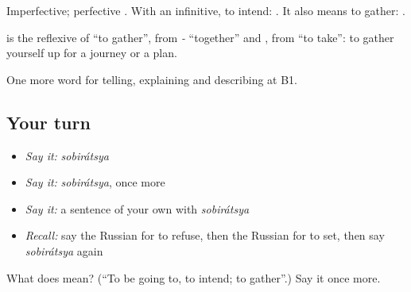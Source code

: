 Imperfective; perfective \emph{}. With an infinitive, to intend: \emph{  }. It also means to gather: \emph{ }.

\begin{cousinweb}
\textbf{} is the reflexive of \emph{} \textquotedblleft{}to gather\textquotedblright{}, from \emph{-} \textquotedblleft{}together\textquotedblright{} and \emph{}, from \emph{} \textquotedblleft{}to take\textquotedblright{}: to gather yourself up for a journey or a plan.
\end{cousinweb}

\begin{grammarlens}[title={What you've built}]
One more word for telling, explaining and describing at B1.
\end{grammarlens}

\subsection*{Your turn}
\begin{itemize}
\raggedright
  \item \emph{Say it:} \emph{sobirátsya}
  \item \emph{Say it:} \emph{sobirátsya}, once more
  \item \emph{Say it:} a sentence of your own with \emph{sobirátsya}
  \item \emph{Recall:} say the Russian for to refuse, then the Russian for to set, then say \emph{sobirátsya} again
\end{itemize}

\begin{tcolorbox}[breakable,colback=teal!4,colframe=teal!35!black,title={Before you move on}]
What does  mean? (\textquotedblleft{}To be going to, to intend; to gather\textquotedblright{}.) Say it once more.
\end{tcolorbox}
